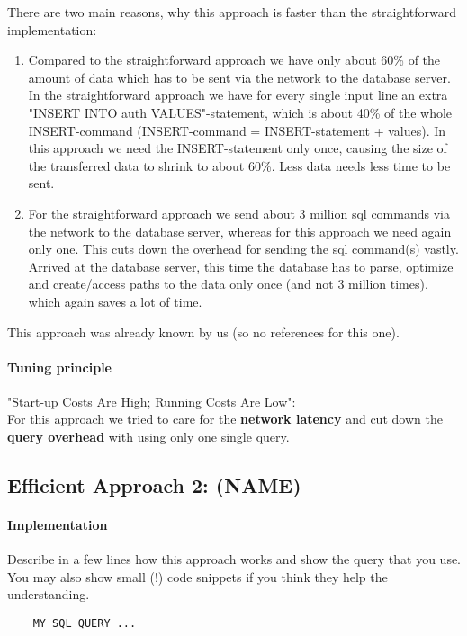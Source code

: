 \documentclass[11pt]{scrartcl}
\begin{document}
  There are two main reasons, why this approach is faster than the straightforward implementation:
  \begin{enumerate}
  	\item Compared to the straightforward approach we have only about 60\% of the amount of data which has to be sent via the network to the database server. In the straightforward approach we have for every single input line an extra "INSERT INTO auth VALUES"-statement, which is about 40\% of the whole INSERT-command (INSERT-command = INSERT-statement + values). In this approach we need the INSERT-statement only once, causing the size of the transferred data to shrink to about 60\%. Less data needs less time to be sent.
    \item For the straightforward approach we send about 3 million sql commands via the network to the database server, whereas for this approach we need again only one. This cuts down the overhead for sending the sql command(s) vastly. Arrived at the database server, this time the database has to parse, optimize and create/access paths to the data only once (and not 3 million times), which again saves a lot of time.
  \end{enumerate}
This approach was already known by us (so no references for this one).

  \paragraph{Tuning principle}

  "Start-up Costs Are High; Running Costs Are Low":
  \\
  For this approach we tried to care for the \textbf{network latency} and cut down the \textbf{query overhead} with using only one single query.

    \subsection*{Efficient Approach 2: (NAME)}

  \paragraph{Implementation}

  Describe in a few lines how this approach works and show the query
  that you use. You may also show small (!) code snippets if you think
  they help the understanding.

{\small
\begin{verbatim}
    MY SQL QUERY ...
\end{verbatim}
}
\end{document}
